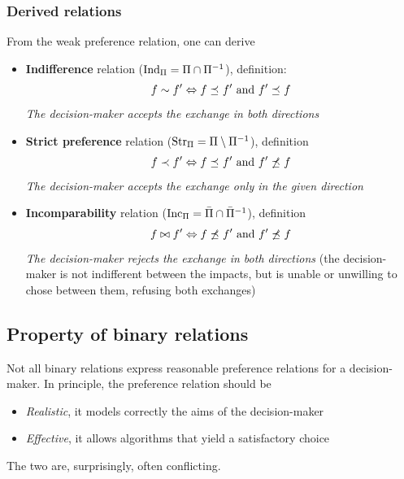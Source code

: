 \subsubsection{Derived relations}
\label{subsubsec:derivedrelations}

From the weak preference relation, one can derive
\begin{itemize}
	\item \textbf{Indifference} relation ($\text{Ind}_{\Pi} = \Pi \cap \Pi^{-1}$), definition:
	$$ f \sim f' \Leftrightarrow f \preceq_{} f' \text{ and } f' \preceq_{} f $$
	\textit{The decision-maker accepts the exchange in both directions}
	
	\item \textbf{Strict preference} relation ($\text{Str}_{\Pi} = \Pi \setminus \Pi^{-1}$), definition
	$$ f \prec f' \Leftrightarrow f \preceq_{} f' \text{ and } f' \not \preceq_{} f $$
	\textit{The decision-maker accepts the exchange only in the given direction}
	
	\item \textbf{Incomparability} relation ($\text{Inc}_{\Pi} = \bar \Pi \cap \bar \Pi^{-1}$), definition
	$$ f \bowtie f' \Leftrightarrow f \not \preceq_{} f' \text{ and } f' \not \preceq_{} f $$
	\textit{The decision-maker rejects the exchange in both directions} (the decision-maker is not indifferent between the impacts, but is unable or unwilling to chose between them, refusing both exchanges)
\end{itemize}

\subsection{Property of binary relations}
\label{subsec:propertybinrel}

Not all binary relations express reasonable preference relations for a decision-maker. In principle, the preference relation should be 
\begin{itemize}
	\item \textit{Realistic}, it models correctly the aims of the decision-maker
	
	\item \textit{Effective}, it allows algorithms that yield a satisfactory choice
\end{itemize}

The two are, surprisingly, often conflicting.

